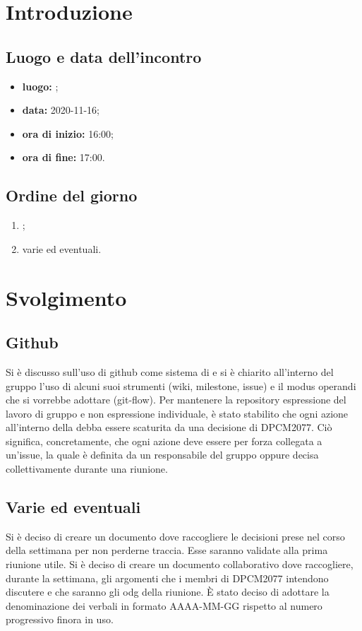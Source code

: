 \section*{Introduzione}
\subsection*{Luogo e data dell'incontro}
\begin{itemize}
	\item \textbf{luogo:} ;
	\item \textbf{data:} 2020-11-16;
	\item \textbf{ora di inizio:} 16:00;
	\item \textbf{ora di fine:} 17:00.
\end{itemize}

\subsection*{Ordine del giorno}
\begin{enumerate}
	\item {};
	\item varie ed eventuali.
\end{enumerate}

\section*{Svolgimento}
\subsection*{Github}
Si è discusso sull'uso di github come sistema di 
e si è chiarito all'interno del gruppo l'uso di alcuni suoi strumenti (wiki, milestone, issue) e il modus operandi che si vorrebbe adottare (git-flow). Per mantenere la repository espressione del lavoro di gruppo e non espressione individuale, è stato stabilito che ogni azione all'interno della  debba essere scaturita da una decisione di DPCM2077. Ciò significa, concretamente, che ogni azione deve essere per forza collegata a un'issue, la quale è definita da un responsabile del gruppo oppure decisa collettivamente durante una riunione. 
\subsection*{Varie ed eventuali}
Si è deciso di creare un documento dove raccogliere le decisioni prese nel corso della settimana per non perderne traccia. Esse saranno validate alla prima riunione utile. Si è deciso di creare un documento collaborativo dove raccogliere, durante la settimana, gli argomenti che i membri di DPCM2077 intendono discutere e che saranno gli odg della riunione.
È stato deciso di adottare la denominazione dei verbali in formato AAAA-MM-GG rispetto al numero progressivo finora in uso.